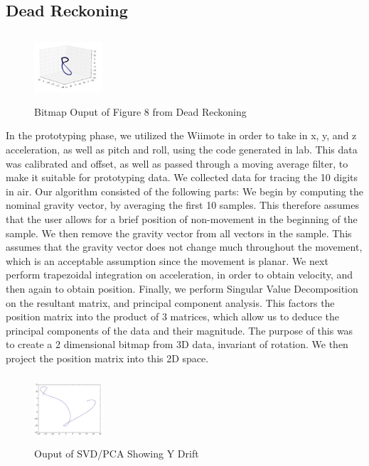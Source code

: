 \documentclass{sig-alternate-05-2015}
\begin{document}
\subsection{Dead Reckoning}

\begin{figure}
\centering
\includegraphics[height=1in, width=1in]{figure1}
\caption{Bitmap Ouput of Figure 8 from Dead Reckoning}
\vskip -6pt
\end{figure}

In the prototyping phase, we utilized the Wiimote in order to take in x, y, and z acceleration, as well as pitch and roll, using the code generated in lab. This data was calibrated and offset, as well as passed through a moving average filter, to make it suitable for prototyping data. We collected data for tracing the 10 digits in air. Our algorithm consisted of the following parts: We begin by computing the nominal gravity vector, by averaging the first 10 samples. This therefore assumes that the user allows for a brief  position of non-movement in the beginning of the sample. We then remove the gravity vector from all vectors in the sample. This assumes that the gravity vector does not change much throughout the movement, which is an acceptable assumption since the movement is planar. We next perform trapezoidal integration on acceleration, in order to obtain velocity, and then again to obtain position. Finally, we perform Singular Value Decomposition on the resultant matrix, and principal component analysis. This factors the position matrix into the product of 3 matrices, which allow us to deduce the principal components of the data and their magnitude. The purpose of this was to create a 2 dimensional bitmap from 3D data, invariant  of rotation. We then project the position matrix into this 2D space.

\begin{figure}
\centering
\includegraphics[height=1in, width=1in]{figure2}
\caption{Ouput of SVD/PCA Showing Y Drift}
\vskip -6pt
\end{figure}
\end{document}

